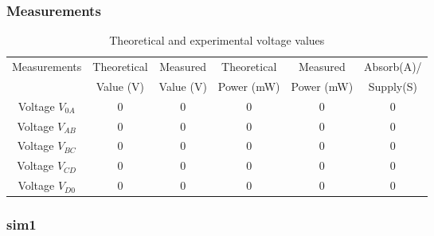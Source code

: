 \documentclass[a4paper]{article}
\begin{document}
\subsubsection{Measurements}
\begin{table}[H]
    \centering
\begin{tabular}{|c|c|c|c|c|c|}\hline
    Measurements & Theoretical & Measured & Theoretical & Measured &
    Absorb(A)/\\
     &  Value (\si{\volt}) &  Value (\si{\volt}) & Power (\si{\milli\watt}) & Power (\si{\milli\watt}) & Supply(S)\\\hline
     Voltage $V_{0A}$ & 0 & 0 & 0 & 0 & 0\\\hline
     Voltage $V_{AB}$ & 0 & 0 & 0 & 0 & 0\\\hline
     Voltage $V_{BC}$ & 0 & 0 & 0 & 0 & 0\\\hline
     Voltage $V_{CD}$ & 0 & 0 & 0 & 0 & 0\\\hline
     Voltage $V_{D0}$ & 0 & 0 & 0 & 0 & 0\\\hline
\end{tabular}
\caption{Theoretical and experimental voltage values}\label{table:1}
\end{table}
\subsubsection{sim1}
\end{document}
